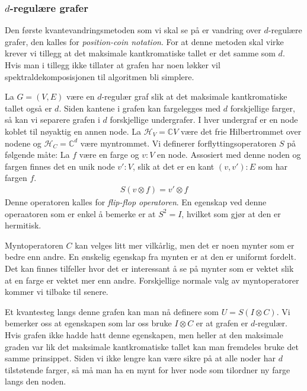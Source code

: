    \subsubsection*{$d$-regulære grafer}

        Den første kvantevandringsmetoden som vi skal se på er vandring over $d$-regulære grafer, den kalles for \emph{position-coin notation}. For at denne metoden skal virke krever vi tillegg at det maksimale kantkromatiske tallet er det samme som $d$. Hvis man i tillegg ikke tillater at grafen har noen løkker vil spektraldekomposisjonen til algoritmen bli simplere.

        La $G=(V,E)$ være en $d$-regulær graf slik at det maksimale kantkromatiske tallet også er $d$. Siden kantene i grafen kan fargelegges med $d$ forskjellige farger, så kan vi separere grafen i $d$ forskjellige undergrafer. I hver undergraf er en node koblet til nøyaktig en annen node. La $\mathcal{H}_V = \mathbb{C}V$ være det frie Hilbertrommet over nodene og $\mathcal{H}_C = \mathbb{C}^d$ være myntrommet. Vi definerer forflyttingsoperatoren $S$ på følgende måte: La $f$ være en farge og $v:V$ en node. Assosiert med denne noden og fargen finnes det en unik node $v':V$, slik at det er en kant $(v,v'):E$ som har fargen $f$. 
        \begin{align*}
            S(v\otimes f)=v'\otimes f 
        \end{align*}
        Denne operatoren kalles for \emph{flip-flop operatoren}. En egenskap ved denne operaatoren som er enkel å bemerke er at $S^2 = I$, hvilket som gjør at den er hermitisk. 
        
        Myntoperatoren $C$ kan velges litt mer vilkårlig, men det er noen mynter som er bedre enn andre. En ønskelig egenskap fra mynten er at den er uniformt fordelt. Det kan finnes tilfeller hvor det er interessant å se på mynter som er vektet slik at en farge er vektet mer enn andre. Forskjellige normale valg av myntoperatorer kommer vi tilbake til senere.

        Et kvantesteg langs denne grafen kan man nå definere som $U=S(I\otimes C)$. Vi bemerker oss at egenskapen som lar oss bruke $I\otimes C$ er at grafen er $d$-regulær. Hvis grafen ikke hadde hatt denne egenskapen, men heller at den maksimale graden var lik det maksimale kantkromatiske tallet kan man fremdeles bruke det samme prinsippet. Siden vi ikke lengre kan være sikre på at alle noder har $d$ tilstøtende farger, så må man ha en mynt for hver node som tilordner ny farge langs den noden.

